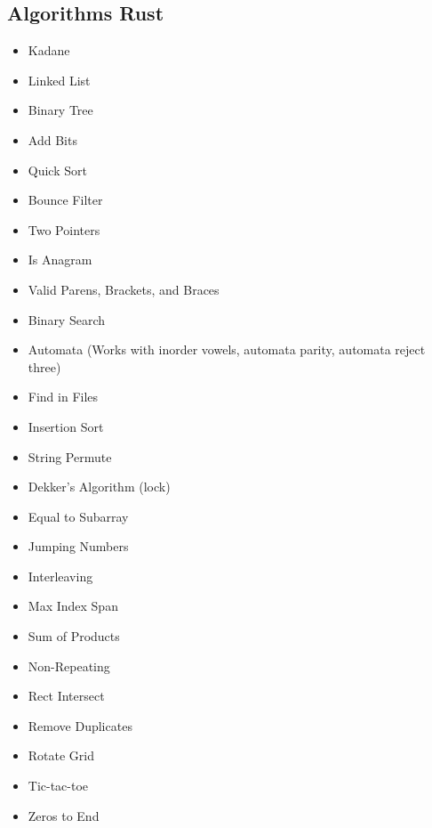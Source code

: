 \documentclass{article}
\begin{document}
\subsection*{Algorithms Rust}
\begin{itemize}
    \item Kadane
    \item Linked List
    \item Binary Tree
    \item Add Bits
    \item Quick Sort
    \item Bounce Filter
    \item Two Pointers
    \item Is Anagram
    \item Valid Parens, Brackets, and Braces
    \item Binary Search
    \item Automata (Works with inorder vowels, automata parity, automata reject three)
    \item Find in Files
    \item Insertion Sort
    \item String Permute
    \item Dekker's Algorithm (lock)
    \item Equal to Subarray
    \item Jumping Numbers
    \item Interleaving
    \item Max Index Span
    \item Sum of Products
    \item Non-Repeating
    \item Rect Intersect
    \item Remove Duplicates
    \item Rotate Grid
    \item Tic-tac-toe
    \item Zeros to End
\end{itemize}
\end{document}
